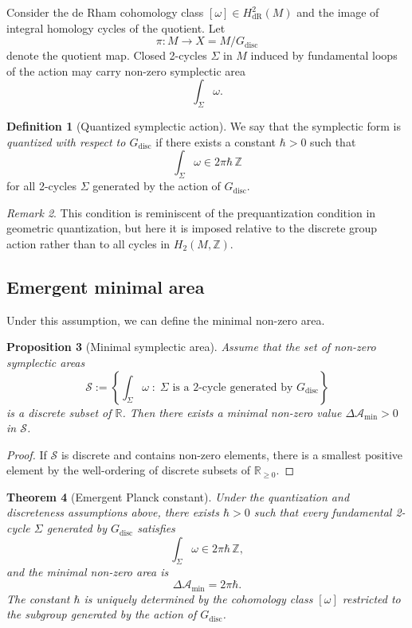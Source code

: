 \documentclass[11pt]{article}
\numberwithin{equation}{section}
\newtheorem{theorem}{Theorem}[section]
\newtheorem{proposition}[theorem]{Proposition}
\theoremstyle{definition}
\newtheorem{definition}[theorem]{Definition}
\theoremstyle{remark}
\newtheorem{remark}[theorem]{Remark}
\newcommand{\Z}{\mathbb{Z}}
\newcommand{\R}{\mathbb{R}}
\newcommand{\Gdisc}{G_{\mathrm{disc}}}
\begin{document}
	Consider the de Rham cohomology class $[\omega]\in H^2_{\mathrm{dR}}(M)$
	and the image of integral homology cycles of the quotient. Let
	\[
	\pi : M \to X=M/\Gdisc
	\]
	denote the quotient map. Closed 2-cycles $\Sigma$ in $M$ induced by
	fundamental loops of the action may carry non-zero symplectic area
	\[
	\int_\Sigma \omega.
	\]
	
	\begin{definition}[Quantized symplectic action]
		We say that the symplectic form is \emph{quantized with respect to
			$\Gdisc$} if there exists a constant $\hbar>0$ such that
		\[
		\int_\Sigma \omega \in 2\pi\hbar\,\Z
		\]
		for all 2-cycles $\Sigma$ generated by the action of $\Gdisc$.
	\end{definition}
	
	\begin{remark}
		This condition is reminiscent of the prequantization condition in
		geometric quantization, but here it is imposed relative to the discrete
		group action rather than to all cycles in $H_2(M,\Z)$.
	\end{remark}
	
	\subsection{Emergent minimal area}
	
	Under this assumption, we can define the minimal non-zero area.
	
	\begin{proposition}[Minimal symplectic area]
		Assume that the set of non-zero symplectic areas
		\[
		\mathcal{S} := \left\{\int_\Sigma \omega \; :\;
		\Sigma \text{ is a 2-cycle generated by }\Gdisc \right\}
		\]
		is a discrete subset of $\R$. Then there exists a minimal non-zero value
		$\Delta\mathcal{A}_{\min}>0$ in $\mathcal{S}$.
	\end{proposition}
	
	\begin{proof}
		If $\mathcal{S}$ is discrete and contains non-zero elements, there is a
		smallest positive element by the well-ordering of discrete subsets of
		$\R_{\ge 0}$.
	\end{proof}
	
	\begin{theorem}[Emergent Planck constant]\label{thm:hbar}
		Under the quantization and discreteness assumptions above, there exists
		$\hbar>0$ such that every fundamental 2-cycle $\Sigma$ generated by
		$\Gdisc$ satisfies
		\[
		\int_\Sigma \omega \in 2\pi\hbar\,\Z,
		\]
		and the minimal non-zero area is
		\[
		\Delta\mathcal{A}_{\min} = 2\pi\hbar.
		\]
		The constant $\hbar$ is uniquely determined by the cohomology class
		$[\omega]$ restricted to the subgroup generated by the action of
		$\Gdisc$.
	\end{theorem}
	
\end{document}
